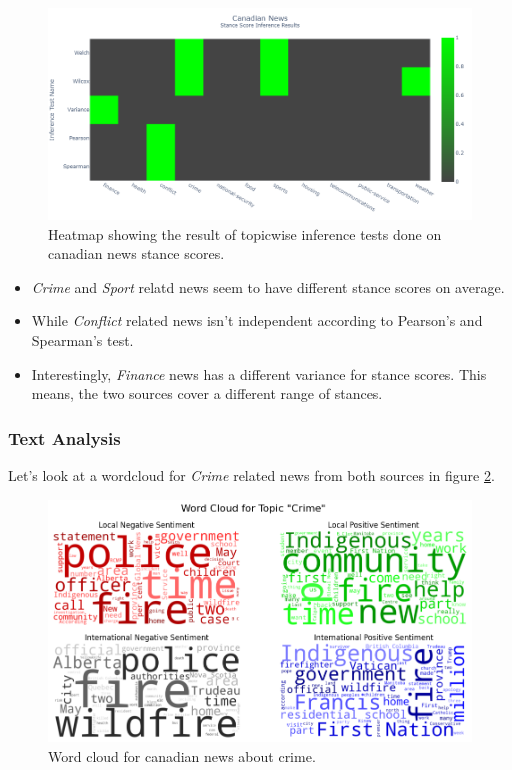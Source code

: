 \documentclass{article}
\theoremstyle{mytheoremstyle}
\theoremstyle{mytheoremstyle}
\theoremstyle{myproblemstyle}
\begin{document}
    \begin{figure}[hp]
        \centering
        \includegraphics[width=\linewidth]{../images/plots/Canada/canada_heatmap_inference_stance.png}
        \caption{Heatmap showing the result of topicwise inference tests done on canadian news stance scores.}
        \label{fig:canada_stance_score_heatmap}
    \end{figure}
    
    \begin{itemize}
        \item \emph{Crime} and \emph{Sport} relatd news seem to have different stance scores on average.
        \item While \emph{Conflict} related news isn't independent according to Pearson's and Spearman's test.
        \item Interestingly, \emph{Finance} news has a different variance for stance scores. This means, the two sources cover a different range of stances.
    \end{itemize}

    \subsubsection{Text Analysis}

    Let's look at a wordcloud for \emph{Crime} related news from both sources in figure \ref{fig:canada_sentiment_score_wordcloud}.

    \begin{figure}[hp]
        \centering
        \includegraphics[width=\linewidth]{../images/plots/Canada/canada_wordcloud_crime.png}
        \caption{Word cloud for canadian news about crime.}
        \label{fig:canada_sentiment_score_wordcloud}
    \end{figure}
\end{document}
